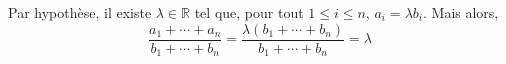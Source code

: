Par hypothèse, il existe $\lambda \in\mathbb{R}$ tel que, pour tout $1\leq i \leq n$, $a_i = \lambda b_i$. Mais alors,
\[
\frac{a_1+\cdots+a_n}{b_1+\cdots+b_n}=\frac{\lambda(b_1+\cdots+b_n)}{b_1+\cdots+b_n} = \lambda
\]
